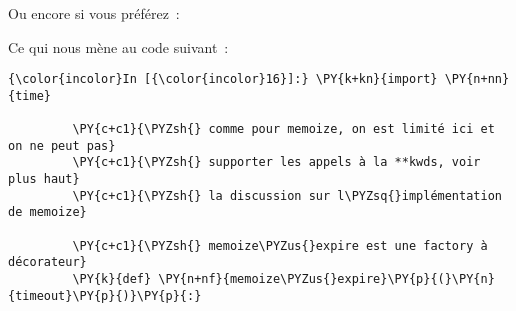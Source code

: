 Ou encore si vous préférez~:

\begin{Shaded}
\begin{Highlighting}[frame=lines,framerule=0.6mm,rulecolor=\color{asisframecolor}]
\OperatorTok{=}\NormalTok{)}
\OperatorTok{=}
\end{Highlighting}
\end{Shaded}

    Ce qui nous mène au code suivant~:

    \begin{Verbatim}[commandchars=\\\{\},frame=single,framerule=0.3mm,rulecolor=\color{cellframecolor}]
{\color{incolor}In [{\color{incolor}16}]:} \PY{k+kn}{import} \PY{n+nn}{time}
         
         \PY{c+c1}{\PYZsh{} comme pour memoize, on est limité ici et on ne peut pas}
         \PY{c+c1}{\PYZsh{} supporter les appels à la **kwds, voir plus haut}
         \PY{c+c1}{\PYZsh{} la discussion sur l\PYZsq{}implémentation de memoize}
         
         \PY{c+c1}{\PYZsh{} memoize\PYZus{}expire est une factory à décorateur}
         \PY{k}{def} \PY{n+nf}{memoize\PYZus{}expire}\PY{p}{(}\PY{n}{timeout}\PY{p}{)}\PY{p}{:}
         

\end{Verbatim}
